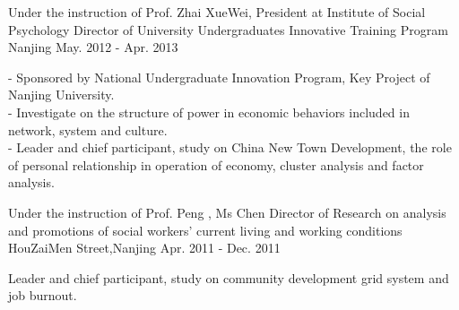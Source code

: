 \begin{cventries}
   \cventry   
    {Under the instruction of Prof. Zhai XueWei, President at Institute of Social Psychology}
    {Director of University Undergraduates Innovative Training Program}
    {Nanjing}
    {May. 2012 - Apr. 2013}    
    {
      \begin{cvitems}
        \item{
        - Sponsored by National Undergraduate Innovation Program, Key Project of Nanjing University. \\%
		- Investigate on the structure of power in economic behaviors included in network, system and culture. \\%
		- Leader and chief participant, study on China New Town Development, the role of personal relationship in operation of economy, cluster analysis and factor analysis.
        }
      \end{cvitems}
    }
    
   \cventry   
    {Under the instruction of Prof. Peng , Ms Chen}
    {Director of Research on analysis and promotions of social workers’ current living and working conditions}
    {HouZaiMen Street,Nanjing}
    {Apr. 2011 - Dec. 2011}    
    {
      \begin{cvitems}
        \item{ 
		Leader and chief participant, study on community development grid system and job burnout.}
      \end{cvitems}
    }

\end{cventries}


